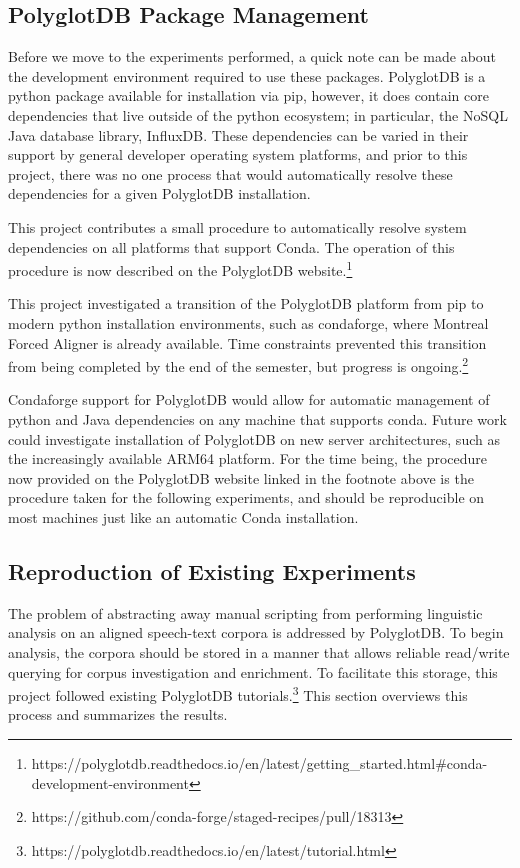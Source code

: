 \documentclass[11pt]{article}
\begin{document}
\subsection{PolyglotDB Package Management}

Before we move to the experiments performed, a quick note can be made about the development environment required to use these packages. PolyglotDB is a python package available for installation via pip, however, it does contain core dependencies that live outside of the python ecosystem; in particular, the NoSQL Java database library, InfluxDB. These dependencies can be varied in their support by general developer operating system platforms, and prior to this project, there was no one process that would automatically resolve these dependencies for a given PolyglotDB installation.

This project contributes a small procedure to automatically resolve system dependencies on all platforms that support Conda. The operation of this procedure is now described on the PolyglotDB website.\footnote{https://polyglotdb.readthedocs.io/en/latest/getting\_started.html\#conda-development-environment}

This project investigated a transition of the PolyglotDB platform from pip to modern python installation environments, such as condaforge\cite{conda_forge_community_2015_4774216}, where Montreal Forced Aligner is already available. Time constraints prevented this transition from being completed by the end of the semester, but progress is ongoing.\footnote{https://github.com/conda-forge/staged-recipes/pull/18313}

Condaforge support for PolyglotDB would allow for automatic management of python and Java dependencies on any machine that supports conda. Future work could investigate installation of PolyglotDB on new server architectures, such as the increasingly available ARM64 platform. For the time being, the procedure now provided on the PolyglotDB website linked in the footnote above is the procedure taken for the following experiments, and should be reproducible on most machines just like an automatic Conda installation.

\subsection{Reproduction of Existing Experiments}

The problem of abstracting away manual scripting from performing linguistic analysis on an aligned speech-text corpora is addressed by PolyglotDB. To begin analysis, the corpora should be stored in a manner that allows reliable read/write querying for corpus investigation and enrichment. To facilitate this storage, this project followed existing PolyglotDB tutorials.\footnote{https://polyglotdb.readthedocs.io/en/latest/tutorial.html} This section overviews this process and summarizes the results.
\end{document}
